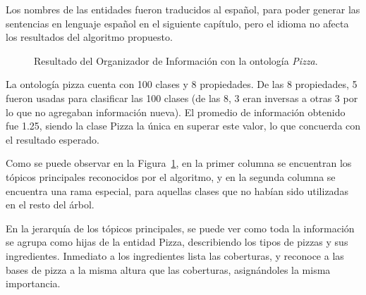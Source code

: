 Los nombres de las entidades fueron traducidos al español, para poder generar las sentencias en lenguaje español en el siguiente capítulo, pero el idioma no afecta los resultados del algoritmo propuesto.

\begin{figure}
\begin{multicols}{2}
\begin{figure}[H]
\end{figure}

\begin{figure}[H]
\end{figure}
\end{multicols}
\caption{Resultado del Organizador de Información con la ontología \emph{Pizza}.}
\label{fig:caso_estudio_pizza}
\end{figure}

La ontología pizza cuenta con 100 clases y 8 propiedades. De las 8 propiedades, 5 fueron usadas  para clasificar las 100 clases (de las 8, 3 eran inversas a otras 3 por lo que no agregaban información nueva). El promedio de información obtenido fue 1.25, siendo la clase Pizza la única en superar este valor, lo que concuerda con el resultado esperado.

Como se puede observar en la Figura~\ref{fig:caso_estudio_pizza}, en la primer columna se encuentran los tópicos principales reconocidos por el algoritmo, y en la segunda columna se encuentra una rama especial, para aquellas clases que no habían sido utilizadas en el resto del árbol.

En la jerarquía de los tópicos principales, se puede ver como toda la información se agrupa como hijas de la entidad Pizza, describiendo los tipos de pizzas y sus ingredientes. Inmediato a los ingredientes lista las coberturas, y reconoce a las bases de pizza a la misma altura que las coberturas, asignándoles la misma importancia.

